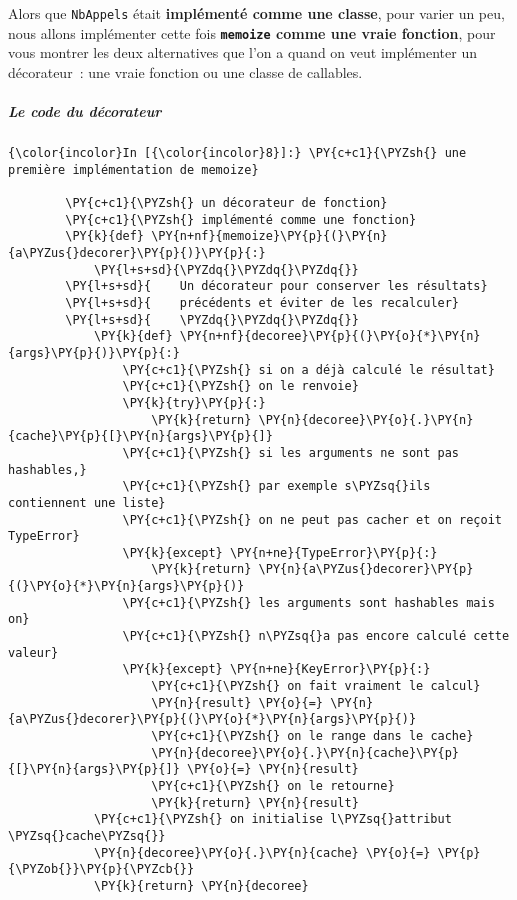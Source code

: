 Alors que \texttt{NbAppels} était \textbf{implémenté comme une classe},
pour varier un peu, nous allons implémenter cette fois
\textbf{\texttt{memoize} comme une vraie fonction}, pour vous montrer
les deux alternatives que l'on a quand on veut implémenter un
décorateur~: une vraie fonction ou une classe de callables.

    \hypertarget{le-code-du-duxe9corateur}{%
\subparagraph{Le code du décorateur}\label{le-code-du-duxe9corateur}}

    \begin{Verbatim}[commandchars=\\\{\},frame=single,framerule=0.3mm,rulecolor=\color{cellframecolor}]
{\color{incolor}In [{\color{incolor}8}]:} \PY{c+c1}{\PYZsh{} une première implémentation de memoize}
        
        \PY{c+c1}{\PYZsh{} un décorateur de fonction}
        \PY{c+c1}{\PYZsh{} implémenté comme une fonction}
        \PY{k}{def} \PY{n+nf}{memoize}\PY{p}{(}\PY{n}{a\PYZus{}decorer}\PY{p}{)}\PY{p}{:}
            \PY{l+s+sd}{\PYZdq{}\PYZdq{}\PYZdq{}}
        \PY{l+s+sd}{    Un décorateur pour conserver les résultats}
        \PY{l+s+sd}{    précédents et éviter de les recalculer}
        \PY{l+s+sd}{    \PYZdq{}\PYZdq{}\PYZdq{}}
            \PY{k}{def} \PY{n+nf}{decoree}\PY{p}{(}\PY{o}{*}\PY{n}{args}\PY{p}{)}\PY{p}{:}
                \PY{c+c1}{\PYZsh{} si on a déjà calculé le résultat}
                \PY{c+c1}{\PYZsh{} on le renvoie}
                \PY{k}{try}\PY{p}{:}
                    \PY{k}{return} \PY{n}{decoree}\PY{o}{.}\PY{n}{cache}\PY{p}{[}\PY{n}{args}\PY{p}{]}
                \PY{c+c1}{\PYZsh{} si les arguments ne sont pas hashables,}
                \PY{c+c1}{\PYZsh{} par exemple s\PYZsq{}ils contiennent une liste}
                \PY{c+c1}{\PYZsh{} on ne peut pas cacher et on reçoit TypeError}
                \PY{k}{except} \PY{n+ne}{TypeError}\PY{p}{:}
                    \PY{k}{return} \PY{n}{a\PYZus{}decorer}\PY{p}{(}\PY{o}{*}\PY{n}{args}\PY{p}{)}
                \PY{c+c1}{\PYZsh{} les arguments sont hashables mais on}
                \PY{c+c1}{\PYZsh{} n\PYZsq{}a pas encore calculé cette valeur}
                \PY{k}{except} \PY{n+ne}{KeyError}\PY{p}{:}
                    \PY{c+c1}{\PYZsh{} on fait vraiment le calcul}
                    \PY{n}{result} \PY{o}{=} \PY{n}{a\PYZus{}decorer}\PY{p}{(}\PY{o}{*}\PY{n}{args}\PY{p}{)}
                    \PY{c+c1}{\PYZsh{} on le range dans le cache}
                    \PY{n}{decoree}\PY{o}{.}\PY{n}{cache}\PY{p}{[}\PY{n}{args}\PY{p}{]} \PY{o}{=} \PY{n}{result}
                    \PY{c+c1}{\PYZsh{} on le retourne}
                    \PY{k}{return} \PY{n}{result}
            \PY{c+c1}{\PYZsh{} on initialise l\PYZsq{}attribut \PYZsq{}cache\PYZsq{}}
            \PY{n}{decoree}\PY{o}{.}\PY{n}{cache} \PY{o}{=} \PY{p}{\PYZob{}}\PY{p}{\PYZcb{}}
            \PY{k}{return} \PY{n}{decoree}
\end{Verbatim}



